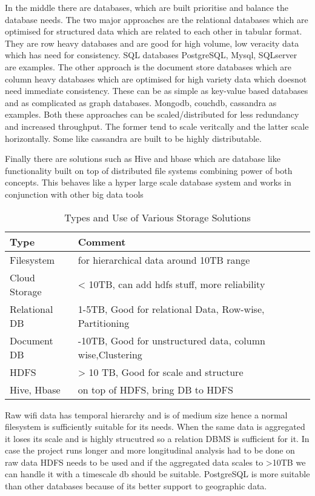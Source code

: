 In the middle there are databases, which are built prioritise and balance the database needs.
The two major approaches are the relational databases which are optimised for structured data which are related to each other in tabular format.
They are row heavy databases and are good for high volume, low veracity data which has need for consistency.
SQL databases PostgreSQL, Mysql, SQLserver are examples.
The other approach is the document store databases which are column heavy databases which are optimised for high variety data which doesnot need immediate consistency.
These can be as simple as key-value based databases and as complicated as graph databases.
Mongodb, couchdb, cassandra as examples.
Both these approaches can be scaled/distributed for less redundancy and increased throughput.
The former tend to scale veritcally and the latter scale horizontally.
Some like cassandra are built to be highly distributable.

Finally there are solutions such as Hive and hbase which are database like functionality built on top of distributed file systems combining power of both concepts.
This behaves like a hyper large scale database system and works in conjunction with other big data tools


\begin{table}
    \centering
    \begin{tabular}{|l|l|}
        \hline
        Type & Comment\\
        \hline
        Filesystem & for hierarchical data around 10TB range\\
        Cloud Storage & \textless{}  10TB, can add hdfs stuff, more reliability\\
        Relational DB & 1-5TB, Good for relational Data, Row-wise, Partitioning\\
        Document DB & -10TB, Good for unstructured data, column wise,Clustering\\
        HDFS & \textgreater{} 10 TB, Good for scale and structure\\
        Hive, Hbase & on top of HDFS, bring DB to HDFS\\
        \hline
    \end{tabular}
    \caption{Types and Use of Various Storage Solutions}
    \label{storage_table}
\end{table}


Raw wifi data has temporal hierarchy and is of medium size hence a normal filesystem is sufficiently suitable for its needs.
When the same data is aggregated it loses its scale and is highly strucutred so a relation DBMS is sufficient for it.
In case the project runs longer and more longitudinal analysis had to be done on raw data HDFS needs to be used and if the aggregated data scales to >10TB we can handle it with a timescale db should be suitable.
PostgreSQL is more suitable than other databases because of its better support to geographic data.

